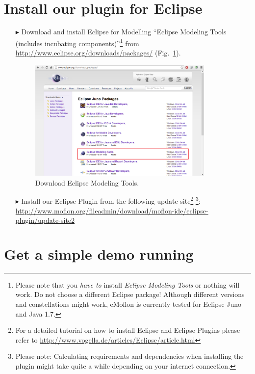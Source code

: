 \section{Install our plugin for Eclipse}
\begin{enumerate}
\item[$\blacktriangleright$] Download and install Eclipse for Modelling ``Eclipse Modeling Tools (includes incubating components)''\footnote{Please note that you \emph{have to} install \emph{Eclipse Modeling Tools} or nothing will work.  Do not choose a different Eclipse package!  Although different versions and constellations might work, eMoflon is currently tested for Eclipse Juno and Java 1.7.} from \url{http://www.eclipse.org/downloads/packages/} (Fig.~\ref{fig_downloadModelingPackage}).

\begin{figure}[htbp]
	\centering
  	\includegraphics[width=0.86\textwidth]{../installation_images/eclipse_modelingpackage.png}
	\caption{Download Eclipse Modeling Tools.}
	\label{fig_downloadModelingPackage}
\end{figure}

\item[$\blacktriangleright$] Install our Eclipse Plugin from the following update site\footnote{For a detailed tutorial on how to install Eclipse and Eclipse Plugins please refer to \url{http://www.vogella.de/articles/Eclipse/article.html}} 
\footnote{Please note: Calculating requirements and dependencies when installing the plugin might take quite a while depending on your internet connection.}:
\url{http://www.moflon.org/fileadmin/download/moflon-ide/eclipse-plugin/update-site2}
\end{enumerate}

\section{Get a simple demo running}

